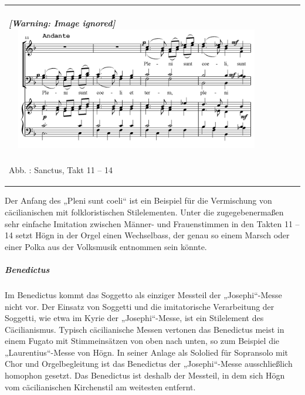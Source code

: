 \begin{center}
\tablefirsthead{}
\tablehead{}
\tabletail{}
\tablelasttail{}
\begin{supertabular}{m{11.689cm}}
\subparagraph[]{  [Warning: Image ignored]
\includegraphics[width=11.506cm,height=5.355cm]{pictures/zulassungsarbeit-img121.png}
 }
Abb. : Sanctus, Takt 11 – 14\\
\end{supertabular}
\end{center}
Der Anfang des „Pleni sunt coeli“ ist ein Beispiel für die Vermischung
von cäcilianischen mit folkloristischen Stilelementen. Unter die
zugegebenermaßen sehr einfache Imitation zwischen Männer- und
Frauenstimmen in den Takten 11 – 14 setzt Högn in der Orgel einen
Wechselbass, der genau so einem Marsch oder einer Polka aus der
Volksmusik entnommen sein könnte.

\subparagraph{Benedictus}
Im Benedictus kommt das Soggetto als einziger Messteil der
„Josephi“-Messe nicht vor. Der Einsatz von Soggetti und die
imitatorische Verarbeitung der Soggetti, wie etwa im Kyrie der
„Josephi“-Messe, ist ein Stilelement des Cäcilianismus. Typisch
cäcilianische Messen vertonen das Benedictus meist in einem Fugato mit
Stimmeinsätzen von oben nach unten, so zum Beispiel die
„Laurentius“-Messe von Högn. In seiner Anlage als Sololied für
Sopransolo mit Chor und Orgelbegleitung ist das Benedictus der
„Josephi“-Messe ausschließlich homophon gesetzt. Das Benedictus ist
deshalb der Messteil, in dem sich Högn vom cäcilianischen Kirchenstil
am weitesten entfernt.

